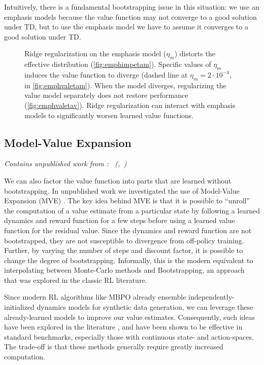 \documentclass[11pt]{article}
\newcommand{\subsectionsubtitle}[1]{\vspace{-0.5em}\textit{#1}\vspace{0.5em}}
\begin{document}
Intuitively, there is a fundamental bootstrapping issue in this situation: we use an emphasis models because the value function may not converge to a good solution under TD, but to use the emphasis model we have to assume it converges to a good solution under TD.

\begin{figure}
  
  \label{fig:emphasisplotseta}
  \caption{Ridge regularization on the emphasis model ($\eta_m$) distorts the effective distribution (\ref{fig:emphimpetam}). Specific values of $\eta_m$ induces the value function to diverge (dashed line at $\eta_m=2\cdot 10^{-4}$, in \ref{fig:emphvaletam}). When the model diverges, regularizing the value model separately does not restore performance (\ref{fig:emphvaletav}). Ridge regularization can interact with emphasis models to significantly worsen learned value functions. }
\end{figure}


\subsection{Model-Value Expansion}
\subsectionsubtitle{Contains unpublished work from \cite{manek2021mve}: \citetitle{manek2021mve}~(\citeauthor{manek2021mve},~\citeyear{manek2021mve})}

We can also factor the value function into parts that are learned without bootstrapping. In unpublished work \cite{manek2021mve} we investigated the use of Model-Value Expansion (MVE) \cite{Feinberg2018ModelBasedVE}.
The key idea behind MVE is that it is possible to ``unroll'' the computation of a value estimate from a particular state by following a learned dynamics and reward function for a few steps before using a learned value function for the residual value. Since the dynamics and reward function are not bootstrapped, they are not susceptible to divergence from off-policy training. Further, by varying the number of steps and discount factor, it is possible to change the degree of bootstrapping. Informally, this is the modern equivalent to interpolating between Monte-Carlo methods and Bootstrapping, an approach that was explored in the classic RL literature.

Since modern RL algorithms like MBPO \cite{janner2019mbpo} already ensemble independently-initialized dynamics models for synthetic data generation, we can leverage these already-learned models to improve our value estimates. Consequently, such ideas have been explored in the literature \cite{lee2021sunrise,Feinberg2018ModelBasedVE,buckman2018steve}, and have been shown to be effective in standard benchmarks, especially those with continuous state- and action-spaces. The trade-off is that these methods generally require greatly increased computation.
\end{document}
